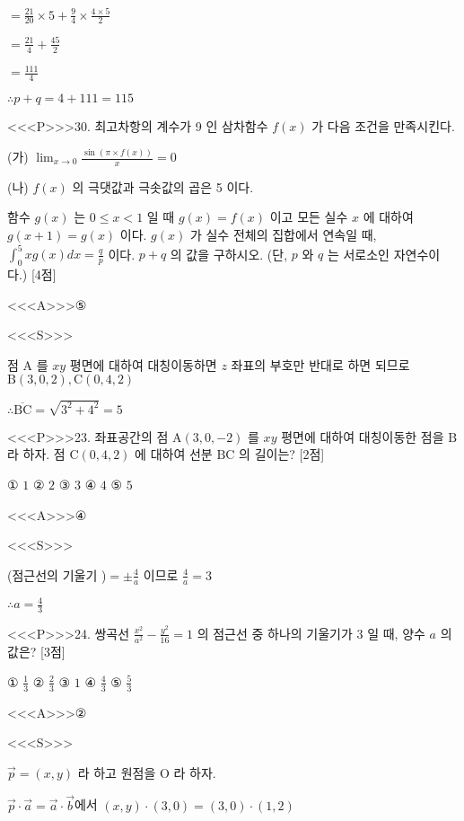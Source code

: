 \documentclass{oblivoir}
\begin{document}
$=\frac{21}{20} \times 5+\frac{9}{4} \times \frac{4 \times 5}{2}$

$=\frac{21}{4}+\frac{45}{2}$

$=\frac{111}{4}$

$\therefore p+q=4+111=115$


<<<P>>>30. 최고차항의 계수가 9 인 삼차함수 $f(x)$ 가 다음 조건을 만족시킨다.

(가) $\lim _{x \rightarrow 0} \frac{\sin (\pi \times f(x))}{x}=0$

(나) $f(x)$ 의 극댓값과 극솟값의 곱은 5 이다.

함수 $g(x)$ 는 $0 \leq x<1$ 일 때 $g(x)=f(x)$ 이고 모든 실수 $x$ 에 대하여 $g(x+1)=g(x)$ 이다.
$g(x)$ 가 실수 전체의 집합에서 연속일 때, $\int_{0}^{5} x g(x) d x=\frac{q}{p}$ 이다. $p+q$ 의 값을 구하시오. (단, $p$ 와 $q$ 는 서로소인 자연수이다.) [4점]



<<<A>>>⑤

<<<S>>>



점 $\mathrm{A}$ 를 $x y$ 평면에 대하여 대칭이동하면 $z$ 좌표의 부호만 반대로 하면 되므로 $\mathrm{B}(3,0,2), \mathrm{C}(0,4,2)$

$\therefore \overline{\mathrm{BC}}=\sqrt{3^{2}+4^{2}}=5$


<<<P>>>23. 좌표공간의 점 $\mathrm{A}(3,0,-2)$ 를 $x y$ 평면에 대하여 대칭이동한 점을 $\mathrm{B}$ 라 하자. 점 $\mathrm{C}(0,4,2)$ 에 대하여 선분 $\mathrm{BC}$ 의 길이는? [2점]

① $1$
② $2$
③ $3$
④ $4$
⑤ $5$


<<<A>>>④

<<<S>>>



(점근선의 기울기 )$=\pm \frac{4}{a}$ 이므로 $\frac{4}{a}=3$

$\therefore a=\frac{4}{3}$


<<<P>>>24. 쌍곡선 $\frac{x^{2}}{a^{2}}-\frac{y^{2}}{16}=1$ 의 점근선 중 하나의 기울기가 3 일 때, 양수 $a$ 의 값은? [3점]

① $\frac{1}{3}$
② $\frac{2}{3}$
③ $1$
④ $\frac{4}{3}$
⑤ $\frac{5}{3}$


<<<A>>>②

<<<S>>>



$ \overrightarrow{p}=(x, y)$ 라 하고 원점을 $\mathrm{O}$ 라 하자.

$\overrightarrow{p} \cdot \overrightarrow{a}=\overrightarrow{a} \cdot \overrightarrow{b}$에서 $(x, y) \cdot(3,0)=(3,0) \cdot(1,2)$
\end{document}
